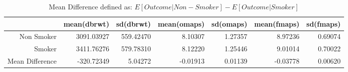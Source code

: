 \begin{table}[ht]
\centering
\begin{tabular}{rrrrrrr}
  \hline
 & mean(dbrwt) & sd(dbrwt) & mean(omaps) & sd(omaps) & mean(fmaps) & sd(fmaps) \\ 
  \hline
Non Smoker & 3091.03927 & 559.42470 & 8.10307 & 1.27357 & 8.97236 & 0.69074 \\ 
  Smoker & 3411.76276 & 579.78310 & 8.12220 & 1.25446 & 9.01014 & 0.70022 \\ 
  Mean Difference & -320.72349 & 5.04272 & -0.01913 & 0.01139 & -0.03778 & 0.00620 \\ 
   \hline
\end{tabular}
\caption{Mean Difference defined as: $E[Outcome|Non-Smoker] - E[Outcome|Smoker]$} 
\end{table}
